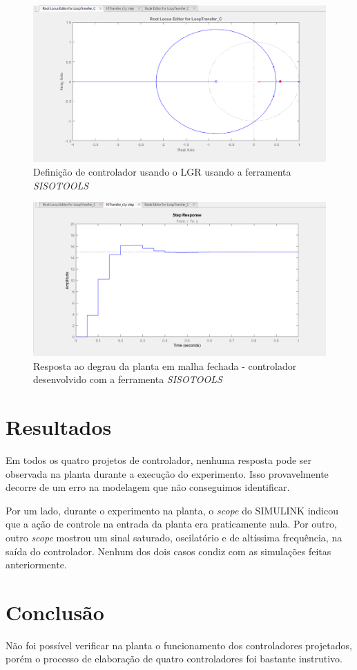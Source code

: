 \documentclass{article}
\begin{document}
\begin{figure}[H]
    \centering
        \includegraphics[width=.8\linewidth]{images/Matlab/SISOTOOLS-LGR.PNG}
        \caption{Definição de controlador usando o LGR usando a ferramenta \textit{SISOTOOLS}}\label{fig:SISOTOOLS-LGR}
\end{figure}

\begin{figure}[H]
    \centering
        \includegraphics[width=.8\linewidth]{images/Matlab/SISOTOOLS-STEP.PNG}
        \caption{Resposta ao degrau da planta em malha fechada - controlador desenvolvido com a ferramenta  \textit{SISOTOOLS}}\label{fig:SISOTOOLS-STEP}
\end{figure}

\section{Resultados}

Em todos os quatro projetos de controlador, nenhuma resposta pode ser observada na planta durante a execução do experimento. Isso provavelmente decorre de um erro na modelagem que não conseguimos identificar.

Por um lado, durante o experimento na planta, o \textit{scope} do SIMULINK indicou que a ação de controle na entrada da planta era praticamente nula. Por outro, outro \textit{scope} mostrou um sinal saturado, oscilatório e de altíssima frequência, na saída do controlador. Nenhum dos dois casos condiz com as simulações feitas anteriormente.

\section{Conclusão}
{
    Não foi possível verificar na planta o funcionamento dos controladores projetados, porém o processo de elaboração de quatro controladores foi bastante instrutivo.
}

\end{document}
